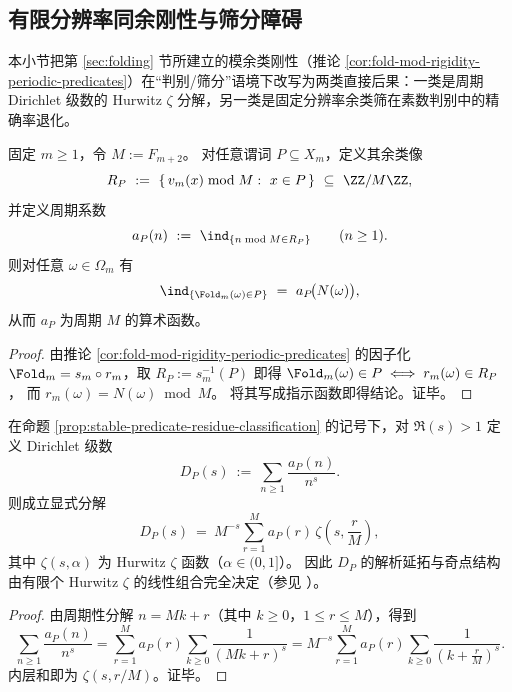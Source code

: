 \subsection{有限分辨率同余刚性与筛分障碍}\label{subsec:stat-stability-finite-resolution-congruence-obstructions}

本小节把第 \ref{sec:folding} 节所建立的模余类刚性（推论 \ref{cor:fold-mod-rigidity-periodic-predicates}）在“判别/筛分”语境下改写为两类直接后果：一类是周期 Dirichlet 级数的 Hurwitz \(\zeta\) 分解，另一类是固定分辨率余类筛在素数判别中的精确率退化。

\begin{proposition}[稳定谓词的余类化与周期系数]\label{prop:stable-predicate-residue-classification}
固定 \(m\ge 1\)，令 \(M:=F_{m+2}\)。
对任意谓词 \(P\subseteq X_m\)，定义其余类像
\[
R_P\ :=\ \{\,v_m(x)\bmod M:\ x\in P\,\}\ \subseteq\ \ZZ/M\ZZ,
\]
并定义周期系数
\[
a_P(n)\ :=\ \ind_{\{n\bmod M\in R_P\}}\qquad(n\ge 1).
\]
则对任意 \(\omega\in\Omega_m\) 有
\[
\ind_{\{\Fold_m(\omega)\in P\}}\ =\ a_P\!\bigl(N(\omega)\bigr),
\]
从而 \(a_P\) 为周期 \(M\) 的算术函数。
\end{proposition}

\begin{proof}
由推论 \ref{cor:fold-mod-rigidity-periodic-predicates} 的因子化 \(\Fold_m=s_m\circ r_m\)，取 \(R_P:=s_m^{-1}(P)\) 即得
\(
\Fold_m(\omega)\in P\iff r_m(\omega)\in R_P
\)，
而 \(r_m(\omega)=N(\omega)\bmod M\)。
将其写成指示函数即得结论。证毕。
\end{proof}

\begin{theorem}\label{thm:periodic-dirichlet-series-hurwitz-decomposition}
在命题 \ref{prop:stable-predicate-residue-classification} 的记号下，对 \(\Re(s)>1\) 定义 Dirichlet 级数
\[
D_P(s)\ :=\ \sum_{n\ge 1}\frac{a_P(n)}{n^s}.
\]
则成立显式分解
\[
D_P(s)\ =\ M^{-s}\sum_{r=1}^{M} a_P(r)\,\zeta\!\left(s,\frac{r}{M}\right),
\]
其中 \(\zeta(s,\alpha)\) 为 Hurwitz \(\zeta\) 函数（\(\alpha\in(0,1]\)）。
因此 \(D_P\) 的解析延拓与奇点结构由有限个 Hurwitz \(\zeta\) 的线性组合完全决定（参见 \cite{Apostol1976,Titchmarsh1986RiemannZeta}）。
\end{theorem}

\begin{proof}
由周期性分解 \(n=Mk+r\)（其中 \(k\ge 0\)，\(1\le r\le M\)），得到
\[
\sum_{n\ge 1}\frac{a_P(n)}{n^s}
=\sum_{r=1}^{M}a_P(r)\sum_{k\ge 0}\frac{1}{(Mk+r)^s}
=M^{-s}\sum_{r=1}^{M}a_P(r)\sum_{k\ge 0}\frac{1}{\left(k+\frac{r}{M}\right)^s}.
\]
内层和即为 \(\zeta(s,r/M)\)。证毕。
\end{proof}

